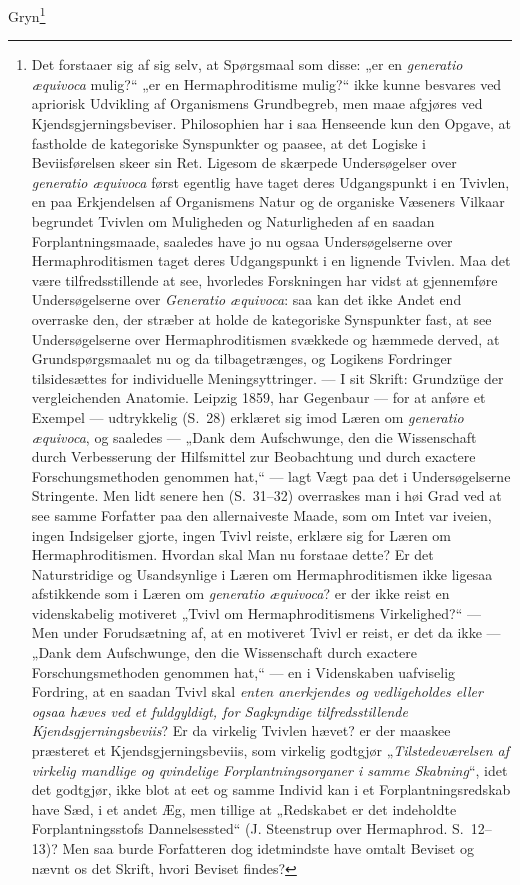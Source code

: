 \documentclass[11pt]{book}
\begin{document}
Gryn\footnote{%
Det forstaaer sig af sig selv, at Spørgsmaal som disse: „er en
\textit{generatio æquivoca} mulig?“ „er en Hermaphroditisme mulig?“
ikke kunne besvares ved apriorisk Udvikling af Organismens
Grundbegreb, men maae afgjøres ved Kjendsgjerningsbeviser.
Philosophien har i saa Henseende kun den Opgave, at fastholde de
kategoriske Synspunkter og paasee, at det Logiske i Beviisførelsen
skeer sin Ret. Ligesom de skærpede Undersøgelser over
\textit{generatio æquivoca} først egentlig have taget deres
Udgangspunkt i en Tvivlen, en paa Erkjendelsen af Organismens Natur og
de organiske Væseners Vilkaar begrundet Tvivlen om Muligheden og
Naturligheden af en saadan Forplantningsmaade, saaledes have jo nu
ogsaa Undersøgelserne over Hermaphroditismen taget deres Udgangspunkt
i en lignende Tvivlen. Maa det være tilfredsstillende at see,
hvorledes Forskningen har vidst at gjennemføre Undersøgelserne over
\textit{Generatio æquivoca}: saa kan det ikke Andet end overraske den,
der stræber at holde de kategoriske Synspunkter fast, at see
Undersøgelserne over Hermaphroditismen svækkede og hæmmede derved, at
Grundspørgsmaalet nu og da tilbagetrænges, og Logikens Fordringer
tilsidesættes for individuelle Meningsyttringer. --- I sit Skrift:
Grundzüge der vergleichenden Anatomie. Leipzig 1859, har Gegenbaur ---
for at anføre et Exempel --- udtrykkelig (S.~28) erklæret sig imod
Læren om \textit{generatio æquivoca}, og saaledes --- „Dank dem
Aufschwunge, den die Wissenschaft durch Verbesserung der Hilfsmittel
zur Beobachtung und durch exactere Forschungsmethoden genommen hat,“
--- lagt Vægt paa det i Undersøgelserne Stringente. Men lidt senere
hen (S.~31--32) overraskes man i høi Grad ved at see samme Forfatter
paa den
allernaiveste Maade, som om Intet var iveien, ingen
Indsigelser gjorte, ingen Tvivl reiste, erklære sig for Læren om
Hermaphroditismen. Hvordan skal Man nu forstaae dette? Er det
Naturstridige og Usandsynlige i Læren om Hermaphroditismen ikke
ligesaa afstikkende som i Læren om \textit{generatio æquivoca}? er der
ikke reist en videnskabelig motiveret „Tvivl om Hermaphroditismens
Virkelighed?“ --- Men under Forudsætning af, at en motiveret Tvivl er
reist, er det da ikke --- „Dank dem Aufschwunge, den die Wissenschaft
durch exactere Forschungsmethoden genommen hat,“ --- en i Videnskaben
uafviselig Fordring, at en saadan Tvivl skal \emph{enten anerkjendes
og vedligeholdes eller ogsaa hæves ved et fuldgyldigt, for Sagkyndige
tilfredsstillende Kjendsgjerningsbeviis}? Er da virkelig Tvivlen
hævet? er der maaskee præsteret et Kjendsgjerningsbeviis, som virkelig
godtgjør „\emph{Tilstedeværelsen af virkelig mandlige og qvindelige
Forplantningsorganer i samme Skabning}“, idet det godtgjør, ikke blot
at eet og samme Individ kan i et Forplantningsredskab have Sæd, i et
andet Æg, men tillige at „Redskabet er det indeholdte
Forplantningsstofs Dannelsessted“ (J. Steenstrup over Hermaphrod.
S.~12--13)? Men saa burde Forfatteren dog idetmindste have omtalt
Beviset og nævnt os det Skrift, hvori Beviset findes?

}
\end{document}
